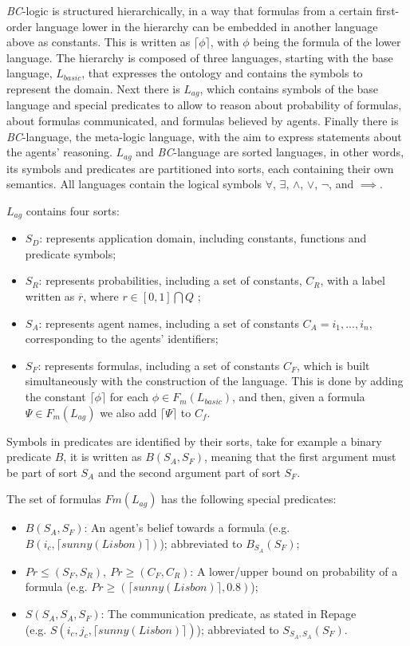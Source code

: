 \textit{BC}-logic is structured hierarchically, in a way that formulas from a certain first-order language lower in the hierarchy can be embedded in another language above as constants. This is written as $\lceil\phi\rceil$, with $\phi$ being the formula of the lower language.
The hierarchy is composed of three languages, starting with the base language, \textit{$L_{basic}$}, that expresses the ontology and contains the symbols to represent the domain. Next there is \textit{$L_{ag}$}, which contains symbols of the base language and special predicates to allow to reason about probability of formulas, about formulas communicated, and formulas believed by agents. Finally there is \textit{BC}-language, the meta-logic language, with the aim to express statements about the agents' reasoning. \textit{$L_{ag}$} and \textit{BC}-language are sorted languages, in other words, its symbols and predicates are partitioned into sorts, each containing their own semantics. All languages contain the logical symbols $\forall$, $\exists$, $\wedge$, $\vee$, $\neg$, and $\implies$.

\textit{$L_{ag}$} contains four sorts:
\begin{itemize}
	\item $S_D$: represents application domain, including constants, functions and predicate symbols;
	\item $S_R$: represents probabilities, including a set of constants, $C_R$, with a label written as $\overline{r}$, where $r \in [0,1]\bigcap Q$ ;
	\item $S_A$: represents agent names, including a set of constants $C_A = {i_1, ..., i_n}$, corresponding to the agents' identifiers;
	\item $S_F$: represents formulas, including a set of constants $C_F$, which is built simultaneously with the construction of the language. This is done by adding the constant $\lceil\phi\rceil$ for each $\phi \in F_m(L_{basic})$, and then, given a formula $\Psi \in F_m(L_{ag})$ we also add $\lceil\Psi\rceil$ to $C_f$.
\end{itemize}

Symbols in predicates are identified by their sorts, take for example a binary predicate $B$, it is written as $B(S_A, S_F)$, meaning that the first argument must be part of sort $S_A$ and the second argument part of sort $S_F$.

The set of formulas $Fm(L_{ag})$ has the following special predicates:
\begin{itemize}
	\item $B(S_A, S_F)$: An agent's belief towards a formula (e.g. $B(i_c, \lceil sunny(Lisbon)\rceil)$); abbreviated to $B_{S_A}(S_F)$;
	\item $Pr\leq(S_F, S_R),\ Pr\geq(C_F, C_R)$: A lower/upper bound on probability of a formula (e.g. $Pr\geq(\lceil sunny(Lisbon)\rceil, 0.8)$);
	\item $S(S_A, S_A, S_F)$: The communication predicate, as stated in Repage \\(e.g. $S(i_c, j_c, \lceil sunny(Lisbon)\rceil)$);
	abbreviated to $S_{S_A, S_A}(S_F)$.
\end{itemize}


